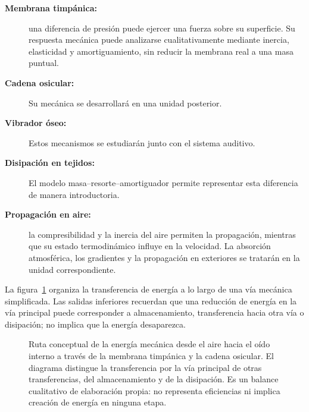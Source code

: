 \begin{description}
    \item[\textbf{Membrana timpánica:}] una diferencia de presión puede ejercer una fuerza sobre su superficie. Su respuesta mecánica puede analizarse cualitativamente mediante inercia, elasticidad y amortiguamiento, sin reducir la membrana real a una masa puntual.

    \item[\textbf{Cadena osicular:}]  Su mecánica se desarrollará en una unidad posterior.

    \item[\textbf{Vibrador óseo:}]  Estos mecanismos se estudiarán junto con el sistema auditivo.

    \item[\textbf{Disipación en tejidos:}]  El modelo masa--resorte--amortiguador permite representar esta diferencia de manera introductoria.

    \item[\textbf{Propagación en aire:}] la compresibilidad y la inercia del aire permiten la propagación, mientras que su estado termodinámico influye en la velocidad. La absorción atmosférica, los gradientes y la propagación en exteriores se tratarán en la unidad correspondiente.
\end{description}

La figura~\ref{fig:u2-balance-energia-auditiva} organiza la transferencia de
energía a lo largo de una vía mecánica simplificada. Las salidas inferiores
recuerdan que una reducción de energía en la vía principal puede corresponder a
almacenamiento, transferencia hacia otra vía o disipación; no implica que la
energía desaparezca.

\begin{figure}[ht]
    \centering
    
    \caption{Ruta conceptual de la energía mecánica desde el aire hacia el oído
    interno a través de la membrana timpánica y la cadena osicular. El diagrama
    distingue la transferencia por la vía principal de otras transferencias,
    del almacenamiento y de la disipación. Es un balance cualitativo de
    elaboración propia: no representa eficiencias ni implica creación de
    energía en ninguna etapa.}
    \label{fig:u2-balance-energia-auditiva}
\end{figure}

